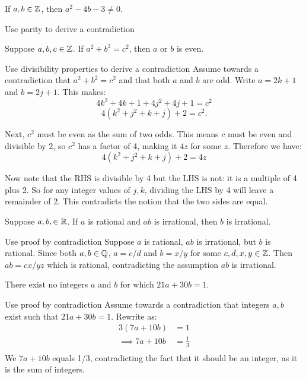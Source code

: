\documentclass{article}
\begin{document}
\begin{problem}
    If $a, b \in \mathbb{Z}$, then $a^2 - 4b - 3 \neq 0$.
\end{problem}
\begin{solution}{Use parity to derive a contradiction}

    
\end{solution}

\begin{problem}
    Suppose $a, b, c \in \mathbb{Z}$. If $a^2 + b^2 = c^2$, then $a$ or $b$ is even.
\end{problem}
\begin{solution}{Use divisibility properties to derive a contradiction}
    Assume towards a contradiction that $a^2 + b^2 = c^2$ and that both $a$ and $b$ are odd. Write $a = 2k + 1$ and $b = 2j + 1$. This makes:
    $$4k^2 + 4k + 1 + 4j^2 + 4j + 1 = c^2$$
    $$4(k^2 + j^2 + k + j) + 2 = c^2.$$

    Next, $c^2$ must be even as the sum of two odds. This means $c$ must be even and divisible by 2, so $c^2$ has a factor of 4, making it $4z$ for some $z$. Therefore we have:
    $$4(k^2 + j^2 + k + j) + 2 = 4z$$

    Now note that the RHS is divisible by 4 but the LHS is not: it is a multiple of 4 plus 2. So for any integer values of $j, k$, dividing the LHS by 4 will leave a remainder of 2. This contradicts the notion that the two sides are equal.
\end{solution}

\begin{problem}
    Suppose $a, b, \in \mathbb{R}$. If $a$ is rational and $ab$ is irrational, then $b$ is irrational.
\end{problem}
\begin{solution}{Use proof by contradiction}
    Suppose $a$ is rational, $ab$ is irrational, but $b$ is rational. Since both $a, b \in \mathbb{Q}$, $a = c/d$ and $b = x/y$ for some $c, d, x, y \in \mathbb{Z}$. Then $ab = cx/yz$ which is rational, contradicting the assumption $ab$ is irrational.
\end{solution}

\begin{problem}
    There exist no integers $a$ and $b$ for which $21a + 30b = 1$. 
\end{problem}
\begin{solution}{Use proof by contradiction}
    Assume towards a contradiction that integers $a, b$ exist such that $21a + 30b = 1$. Rewrite as:
    \begin{align*}
        3(7a + 10b) &= 1 \\
        \implies 7a + 10b &= \frac{1}{3} \\
    \end{align*}
    We $7a + 10b$  equals 1/3, contradicting the fact that it should be an integer, as it is the sum of integers.
\end{solution}
\end{document}
